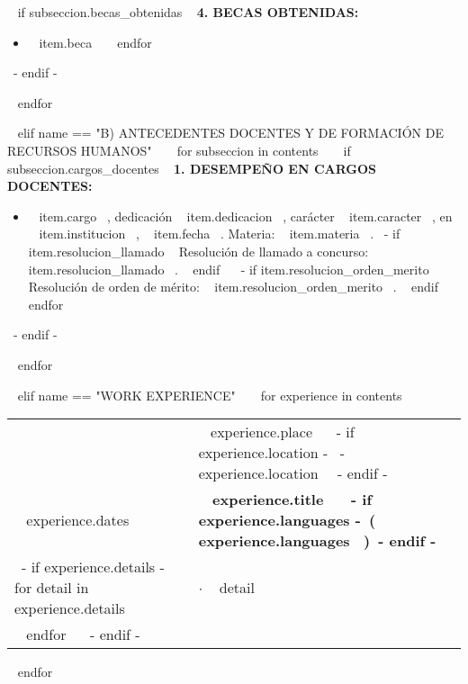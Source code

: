     ~{ if subseccion.becas_obtenidas }~
      \textbf{4. BECAS OBTENIDAS:}
      \begin{itemize}
      ~{ for item in subseccion.becas_obtenidas }~
        \item ~{{ item.beca }}~
        \vspace{1mm}
      ~{ endfor }~
      \end{itemize}
      \vspace{1mm}
    ~{- endif -}~

  ~{ endfor }~
  \vspace{2mm}

~{ elif name == "B) ANTECEDENTES DOCENTES Y DE FORMACIÓN DE RECURSOS HUMANOS" }~
  ~{ for subseccion in contents }~
    ~{ if subseccion.cargos_docentes }~
      \textbf{1. DESEMPEÑO EN CARGOS DOCENTES:}
      \begin{itemize}
      ~{ for item in subseccion.cargos_docentes }~
        \item ~{{ item.cargo }}~, dedicación ~{{ item.dedicacion }}~, carácter ~{{ item.caracter }}~, en ~{{ item.institucion }}~, ~{{ item.fecha }}~. Materia: ~{{ item.materia }}~.
              ~{- if item.resolucion_llamado }~ Resolución de llamado a concurso: ~{{ item.resolucion_llamado }}~. ~{ endif }~
              ~{- if item.resolucion_orden_merito }~ Resolución de orden de mérito: ~{{ item.resolucion_orden_merito }}~. ~{ endif }~
      ~{ endfor }~
      \end{itemize}
      \vspace{1mm}
    ~{- endif -}~

  ~{ endfor }~
  \vspace{2mm}


~{ elif name == "WORK EXPERIENCE" }~
  ~{ for experience in contents }~
    \begin{tabular}{ @{} p{32mm} p{135mm} @{} }
    & \small ~{{ experience.place }}~ ~{- if experience.location -}~ \small \hspace{1mm}- ~{{ experience.location }}~~{- endif -}~\\
    \small ~{{ experience.dates }}~ & \bf\small ~{{ experience.title }}~ ~{- if experience.languages -}~\small\hspace{1mm}\bf\color{maincolor}(~{{ experience.languages }}~)~{- endif -}~\\
    ~{- if experience.details -}~
      ~{ for detail in experience.details }~
        & $\cdot$ \small ~{{ detail }}~ \\
      ~{ endfor }~
    ~{- endif -}~
    \end{tabular}
    \vspace{2mm}
  ~{ endfor }~
  \vspace{20mm}

